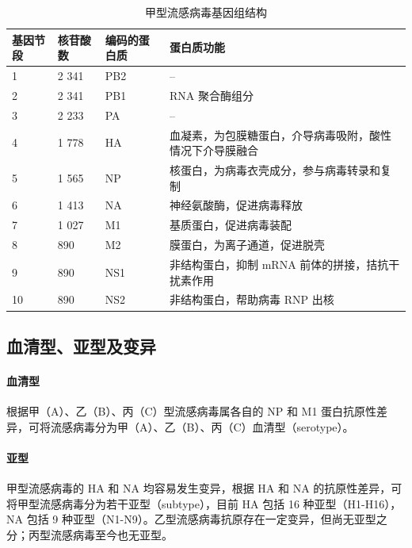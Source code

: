 \documentclass[9pt,a4paper,twoside]{rho-class/rho}
\begin{document}
        \begin{table}[H]
            \centering
            \caption{甲型流感病毒基因组结构}
            \label{tab:influenza_genome}
            \begin{tabular}{@{}llll@{}}
            \toprule
            \textbf{基因节段} & \textbf{核苷酸数} & \textbf{编码的蛋白质} & \textbf{蛋白质功能} \\
            \midrule
            1 & 2 341 & PB2 & -- \\
            2 & 2 341 & PB1 & RNA 聚合酶组分 \\
            3 & 2 233 & PA & -- \\
            4 & 1 778 & HA & 血凝素，为包膜糖蛋白，介导病毒吸附，酸性情况下介导膜融合 \\
            5 & 1 565 & NP & 核蛋白，为病毒衣壳成分，参与病毒转录和复制 \\
            6 & 1 413 & NA & 神经氨酸酶，促进病毒释放 \\
            7 & 1 027 & M1 & 基质蛋白，促进病毒装配 \\
            8 & 890 & M2 & 膜蛋白，为离子通道，促进脱壳 \\
            9 & 890 & NS1 & 非结构蛋白，抑制 mRNA 前体的拼接，拮抗干扰素作用 \\
            10 & 890 & NS2 & 非结构蛋白，帮助病毒 RNP 出核 \\
            \bottomrule
            \end{tabular}
        \end{table}

\subsection{血清型、亚型及变异}

\paragraph{血清型} 根据甲（A）、乙（B）、丙（C）型流感病毒属各自的 NP 和 M1 蛋白抗原性差异，可将流感病毒分为甲（A）、乙（B）、丙（C）血清型（serotype）。

\paragraph{亚型} 甲型流感病毒的 HA 和 NA 均容易发生变异，根据 HA 和 NA 的抗原性差异，可将甲型流感病毒分为若干亚型（subtype），目前 HA 包括 16 种亚型（H1-H16），NA 包括 9 种亚型（N1-N9）。乙型流感病毒抗原存在一定变异，但尚无亚型之分；丙型流感病毒至今也无亚型。
\end{document}
